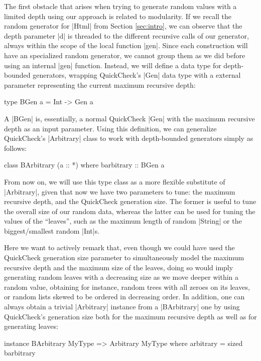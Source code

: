 The first obstacle that arises when trying to generate random values with a
limited depth using our approach is related to modularity.
%
If we recall the random generator for |Html| from Section \ref{sec:intro}, we
can observe that the depth parameter |d| is threaded to the different recursive
calls of our generator, always within the scope of the local function |gen|.
%
Since each construction will have an specialized random generator, we cannot
group them as we did before using an internal |gen| function.
%
Instead, we will define a data type for depth-bounded generators, wrapping
QuickCheck's |Gen| data type with a external parameter representing the current
maximum recursive depth:

\begin{code}
type BGen a = Int -> Gen a
\end{code}
%
A |BGen| is, essentially, a normal QuickCheck |Gen| with the maximum recursive
depth as an input parameter.
%
Using this definition, we can generalize QuickCheck's |Arbitrary| class to work
with depth-bounded generators simply as follows:

\begin{code}
class BArbitrary (a :: *) where
  barbitrary :: BGen a
\end{code}


From now on, we will use this type class as a more flexible substitute of
|Arbitrary|, given that now we have two parameters to tune: the maximum
recursive depth, and the QuickCheck generation size.
%
The former is useful to tune the overall size of our random data, whereas the
latter can be used for tuning the values of the ``leaves'', such as the maximum
length of random |String| or the biggest/smallest random |Int|s.


Here we want to actively remark that, even though we could have used the
QuickCheck generation size parameter to simultaneously model the maximum
recursive depth and the maximum size of the leaves, doing so would imply
generating random leaves with a decreasing size as we move deeper within a random
value, obtaining for instance, random trees with all zeroes on its leaves, or
random lists skewed to be ordered in decreasing order.
%
In addition, one can always obtain a trivial |Arbitrary| instance from a
|BArbitrary| one by using QuickCheck's generation size both for the maximum
recursive depth as well as for generating leaves:

\begin{code}
instance BArbitrary MyType => Arbitrary MyType where
  arbitrary = sized barbitrary
\end{code} %


